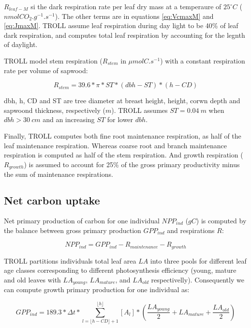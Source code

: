 \documentclass[]{article}
\theoremstyle{definition}
\theoremstyle{definition}
\theoremstyle{remark}
\begin{document}
\(R_{leaf-M}\) si the dark respiration rate per leaf dry mass at a
temperaure of \(25^\circ C\) (\(nmolCO_2.g^{-1}.s^{-1}\)). The other
terms are in equations \eqref{eq:VcmaxM} and \eqref{eq:JmaxM}. TROLL assume
leaf respiration during day light to be 40\% of leaf dark respiration,
and computes total leaf respiration by accounting for the legnth of
daylight.

TROLL model stem respiration (\(R_{stem}\) in \(\mu molC.s^{-1}\)) with
a constant respiration rate per volume of sapwood:

\begin{equation}
  R_{stem} = 39.6*\pi*ST*(dbh-ST)*(h-CD)
  \label{eq:Rs}
\end{equation}

dbh, h, CD and ST are tree diameter at breast height, height, corwn
depth and sapwoond thickness, respectively (\(m\)). TROLL assumes
\(ST=0.04~m\) when \(dbh>30~cm\) and an increasing \(ST\) for lower
\(dbh\).

Finally, TROLL computes both fine root maintenance respiration, as half
of the leaf maintenance respiration. Whereas coarse root and branch
maintenance respiration is computed as half of the stem respiration. And
growth respiration (\(R_{growth}\)) is assumed to account for 25\% of
the gross primary productivity minus the sum of maintenance
respirations.

\subsection{Net carbon uptake}\label{net-carbon-uptake}

Net primary production of carbon for one individual \(NPP_{ind}\)
(\(gC\)) is computed by the balance between gross primary production
\(GPP_{ind}\) and respirations \(R\):

\begin{equation}
  NPP_{ind} = GPP_{ind} - R_{maintenance} - R_{growth}
  \label{eq:NPP}
\end{equation}

TROLL partitions individuals total leaf area \(LA\) into three pools for
different leaf age classes corresponding to different photosynthesis
efficiency (young, mature and old leaves with \(LA_{young}\),
\(LA_{mature}\), and \(LA_{old}\) respectivelly). Consequently we can
compute growth primary production for one individual as:

\begin{equation}
  GPP_{ind} = 189.3 * \Delta t * \sum _{l= \lfloor h-CD \rfloor +1} ^{\lfloor h \rfloor} [A_l] * (\frac{LA_{young}}{2} + LA_{mature} + \frac{LA_{old}}{2})
  \label{eq:GPP}
\end{equation}
\end{document}
